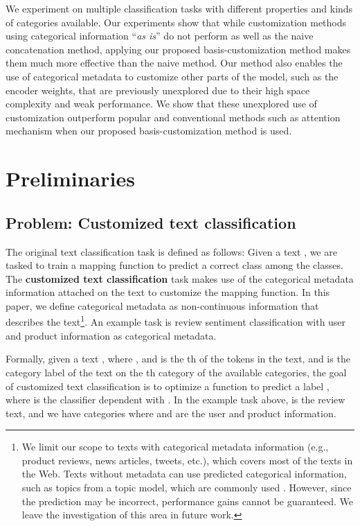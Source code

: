 \documentclass[11pt,a4paper]{article}
\begin{document}
We experiment on multiple classification tasks with different properties and kinds of categories available. Our experiments show that while customization methods using categorical information ``\textit{as is}'' do not perform as well as the naive concatenation method, applying our proposed basis-customization method makes them much more effective than the naive method. Our method also enables the use of categorical metadata to customize other parts of the model, such as the encoder weights, that are previously unexplored due to their high space complexity and weak performance. We show that these unexplored use of customization outperform popular and conventional methods such as attention mechanism when our proposed basis-customization method is used.

\section{Preliminaries}

\subsection{Problem: Customized text classification}

The original text classification task is defined as follows: Given a text , we are tasked to train a mapping function  to predict a correct class  among the  classes. The \textbf{customized text classification} task makes use of the categorical metadata information attached on the text to customize the mapping function. 
In this paper, we define categorical metadata as non-continuous information that describes the text\footnote{We limit our scope to texts with categorical metadata information (e.g., product reviews, news articles, tweets, etc.), which covers most of the texts in the Web. Texts without metadata can use predicted categorical information, such as topics from a topic model, which are commonly used \cite{zhao2017topic,chou2017context}. However, since the prediction may be incorrect, performance gains cannot be guaranteed. We leave the investigation of this area in future work.}.
An example task is review sentiment classification with user and product information as categorical metadata.

Formally, given a text , where ,  and  is the th of the  tokens in the text, and  is the category label of the text on the th category of the  available categories, the goal of customized text classification is to optimize a function  to predict a label , where  is the classifier dependent with . In the example task above,  is the review text, and we have  categories where  and  are the user and product information.
\end{document}
